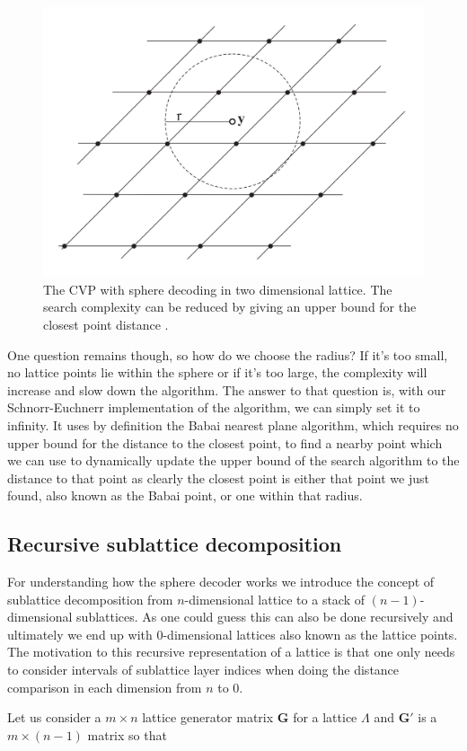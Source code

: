 \documentclass[english,12pt,a4paper,pdftex,sci,utf8]{aaltothesis}
\begin{document}
\begin{figure}[ht]
  \centering
  \includegraphics[width=0.8\linewidth]{sphere_decoder}
  \caption{The CVP with sphere decoding in two dimensional lattice. The search complexity can be reduced by giving an upper bound for the closest point distance \cite{mia}.}
  \label{fig:sphdec}
\end{figure}

\par One question remains though, so how do we choose the radius? If it's too small, no lattice points lie within the sphere or if it's too large, the complexity will increase and slow down the algorithm. The answer to that question is, with our Schnorr-Euchnerr implementation of the algorithm, we can simply set it to infinity. It uses by definition the Babai nearest plane algorithm, which requires no upper bound for the distance to the closest point, to find a nearby point which we can use to dynamically update the upper bound of the search algorithm to the distance to that point as clearly the closest point is either that point we just found, also known as the Babai point, or one within that radius.

\subsection{Recursive sublattice decomposition}

For understanding how the sphere decoder works we introduce the concept of sublattice decomposition from $n$-dimensional lattice to a stack of $(n-1)$-dimensional sublattices. As one could guess this can also be done recursively and ultimately we end up with 0-dimensional lattices also known as the lattice points. The motivation to this recursive representation of a lattice is that one only needs to consider intervals of sublattice layer indices when doing the distance comparison in each dimension from $n$ to $0$.
\par Let us consider a $m \times n$ lattice generator matrix $\mathbf{G}$ for a lattice $\Lambda$ and $\mathbf{G}'$ is a $m \times (n-1)$ matrix so that
 
\end{document}
